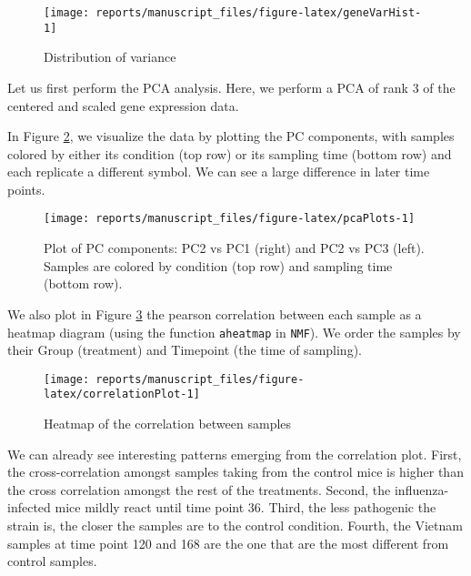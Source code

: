 \documentclass[9pt,a4paper,]{extarticle}
\begin{document}
\begin{figure}[H]

{\centering \texttt{[image: reports/manuscript\_files/figure-latex/geneVarHist-1]} 

}

\caption{Distribution of variance}\label{fig:geneVarHist}
\end{figure}

Let us first perform the PCA analysis. Here, we perform a PCA of rank 3 of the
centered and scaled gene expression data.

In Figure \ref{fig:pcaPlots}, we visualize the data by plotting the PC components, with samples colored by either its
condition (top row) or its sampling time (bottom row) and each replicate a different symbol. We can see a large difference in later time points.

\begin{figure}[H]

{\centering \texttt{[image: reports/manuscript\_files/figure-latex/pcaPlots-1]} 

}

\caption{Plot of PC components: PC2 vs PC1 (right) and PC2 vs PC3 (left). Samples are colored by condition (top row) and sampling time (bottom row).}\label{fig:pcaPlots}
\end{figure}

We also plot in Figure \ref{fig:correlationPlot} the pearson correlation between each sample as a heatmap diagram (using the function \texttt{aheatmap} in \texttt{NMF}). We order the
samples by their Group (treatment) and Timepoint (the time of sampling).

\begin{figure}[H]

{\centering \texttt{[image: reports/manuscript\_files/figure-latex/correlationPlot-1]} 

}

\caption{Heatmap of the correlation between samples}\label{fig:correlationPlot}
\end{figure}

We can already see interesting patterns emerging from the correlation plot.
First, the cross-correlation amongst samples taking from the control mice is
higher than the cross correlation amongst the rest of the treatments. Second,
the influenza-infected mice mildly react until time point 36. Third, the less
pathogenic the strain is, the closer the samples are to the control condition.
Fourth, the Vietnam samples at time point 120 and 168 are the one that are the
most different from control samples.
\end{document}
